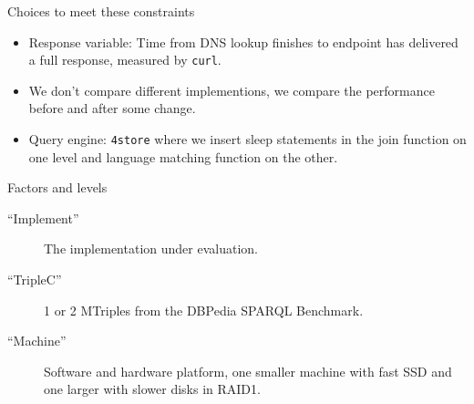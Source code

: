 \documentclass[english,usenames,dvipsnames,aspectratio=169]{beamer}
\begin{document}
\begin{frame}{Choices to meet these constraints}

  \begin{itemize}
  \item Response variable: Time from DNS lookup finishes to endpoint
    has delivered a full response, measured by \texttt{curl}.
  \item We don't compare different implementions, we compare the
    performance before and after some change.
  \item Query engine: \texttt{4store} where we insert \textsf{sleep}
    statements in the join function on one level and language matching
    function on the other. 
  \end{itemize}



\end{frame}


\begin{frame}{Factors and levels}
  \begin{description}
  \item [``Implement''] The implementation under evaluation.
  \item [``TripleC''] 1 or 2 MTriples from the DBPedia SPARQL
    Benchmark.
  \item [``Machine''] Software and hardware platform, one smaller
    machine with fast SSD and one larger with slower disks in RAID1.
  \end{description}
\end{frame}
\end{document}
